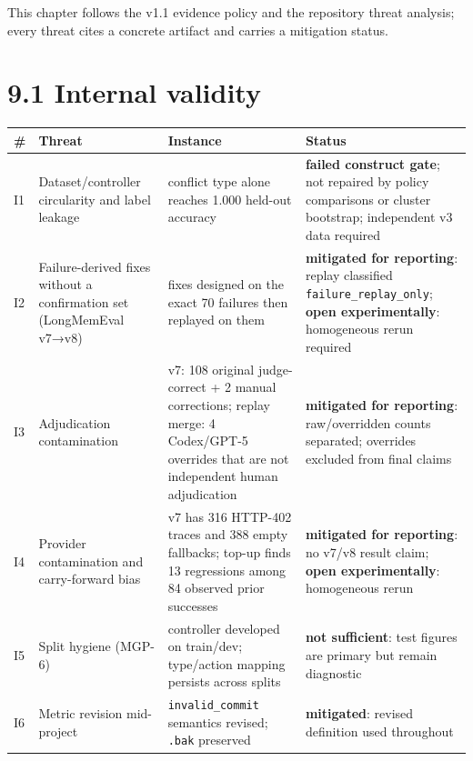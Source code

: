 This chapter follows the v1.1 evidence policy and the repository threat
analysis; every threat cites a concrete artifact and carries a
mitigation status.

\section{9.1 Internal validity}\label{internal-validity}

{\def\LTcaptype{none} %
\begin{longtable}[]{@{}
  >{\raggedright\arraybackslash}p{}
  >{\raggedright\arraybackslash}p{}
  >{\raggedright\arraybackslash}p{}
  >{\raggedright\arraybackslash}p{}@{}}
\toprule\noalign{}
\begin{minipage}[b]{\linewidth}\raggedright
\#
\end{minipage} & \begin{minipage}[b]{\linewidth}\raggedright
Threat
\end{minipage} & \begin{minipage}[b]{\linewidth}\raggedright
Instance
\end{minipage} & \begin{minipage}[b]{\linewidth}\raggedright
Status
\end{minipage} \\
\midrule\noalign{}
\endhead
\bottomrule\noalign{}
\endlastfoot
I1 & Dataset/controller circularity and label leakage & conflict type
alone reaches 1.000 held-out accuracy & \textbf{failed construct gate};
not repaired by policy comparisons or cluster bootstrap; independent v3
data required \\
I2 & Failure-derived fixes without a confirmation set (LongMemEval
v7→v8) & fixes designed on the exact 70 failures then replayed on them &
\textbf{mitigated for reporting}: replay classified
\texttt{failure\_replay\_only}; \textbf{open experimentally}:
homogeneous rerun required \\
I3 & Adjudication contamination & v7: 108 original judge-correct + 2
manual corrections; replay merge: 4 Codex/GPT-5 overrides that are not
independent human adjudication & \textbf{mitigated for reporting}:
raw/overridden counts separated; overrides excluded from final claims \\
I4 & Provider contamination and carry-forward bias & v7 has 316 HTTP-402
traces and 388 empty fallbacks; top-up finds 13 regressions among 84
observed prior successes & \textbf{mitigated for reporting}: no v7/v8
result claim; \textbf{open experimentally}: homogeneous rerun \\
I5 & Split hygiene (MGP-6) & controller developed on train/dev;
type/action mapping persists across splits & \textbf{not sufficient}:
test figures are primary but remain diagnostic \\
I6 & Metric revision mid-project & \texttt{invalid\_commit} semantics
revised; \texttt{.bak} preserved & \textbf{mitigated}: revised
definition used throughout \\
\end{longtable}
}

